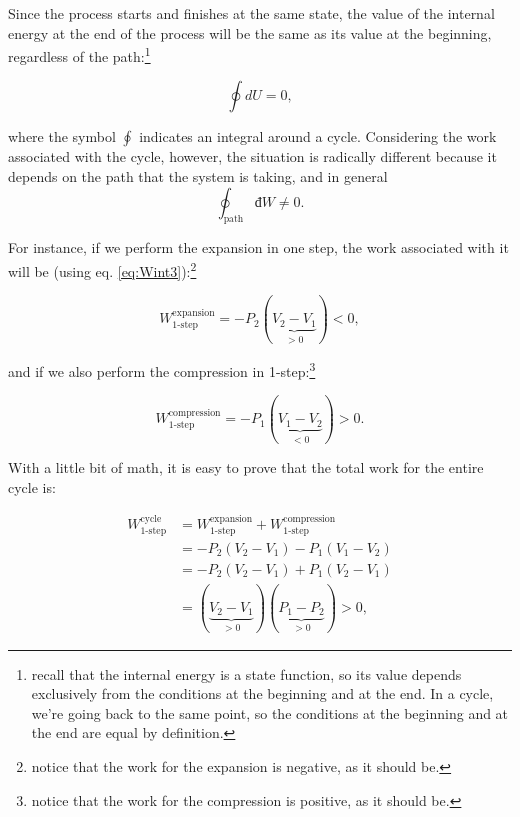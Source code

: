 \documentclass[
  9pt,
]{extbook}
\theoremstyle{definition}
\theoremstyle{definition}
\theoremstyle{definition}
\theoremstyle{definition}
\theoremstyle{remark}
\begin{document}
Since the process starts and finishes at the same state, the value of the internal energy at the end of the process will be the same as its value at the beginning, regardless of the path:\footnote{recall that the internal energy is a state function, so its value depends exclusively from the conditions at the beginning and at the end. In a cycle, we're going back to the same point, so the conditions at the beginning and at the end are equal by definition.}

\begin{equation}
  \oint dU=0,
  \label{eq:de0}
\end{equation}

where the symbol \(\oint\) indicates an integral around a cycle. Considering the work associated with the cycle, however, the situation is radically different because it depends on the path that the system is taking, and in general
\begin{equation}
\oint_{\text{path}} đW \neq 0.
  \label{eq:dw0}
\end{equation}

For instance, if we perform the expansion in one step, the work associated with it will be (using eq. \eqref{eq:Wint3}):\footnote{notice that the work for the expansion is negative, as it should be.}

\begin{equation}
  W^{\text{expansion}}_{\text{1-step}}=-P_2(\underbrace{V_2-V_1}_{>0})<0,
  \label{eq:Wexp1}
\end{equation}

and if we also perform the compression in 1-step:\footnote{notice that the work for the compression is positive, as it should be.}

\begin{equation}
  W^{\text{compression}}_{\text{1-step}}=-P_1(\underbrace{V_1-V_2}_{<0})>0.
  \label{eq:Wcomp1}
\end{equation}

With a little bit of math, it is easy to prove that the total work for the entire cycle is:

\begin{equation}
\begin{aligned}
W^{\text{cycle}}_{\text{1-step}} {} & =  W^{\text{expansion}}_{\text{1-step}}+W^{\text{compression}}_{\text{1-step}} \\
 & = -P_2(V_2-V_1)-P_1(V_1-V_2) \\
 & = -P_2(V_2-V_1)+P_1(V_2-V_1) \\
 & = (\underbrace{V_2-V_1}_{>0})(\underbrace{P_1-P_2}_{>0}) > 0,
\end{aligned}
  \label{eq:Wtot1}
\end{equation}
\end{document}
